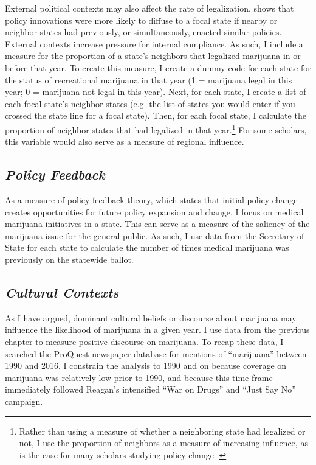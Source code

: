 External political contexts may also affect the rate of legalization. \citet{boushey_2016}shows that policy innovations were more likely to diffuse to a focal state if nearby or neighbor states had previously, or simultaneously, enacted similar policies. External contexts increase pressure for internal compliance. As such, I include a measure for the proportion of a state's neighbors that legalized marijuana in or before that year. To create this measure, I create a dummy code for each state for the status of recreational marijuana in that year (1 = marijuana legal in this year; 0 = marijuana not legal in this year). Next, for each state, I create a list of each focal state's neighbor states (e.g. the list of states you would enter if you crossed the state line for a focal state). Then, for each focal state, I calculate the proportion of neighbor states that had legalized in that year.\footnote{Rather than using a measure of whether a neighboring state had legalized or not, I use the proportion of neighbors as a measure of increasing influence, as is the case for many scholars studying policy change \citep{boushey_2016,key_1949}.} For some scholars, this variable would also serve as a measure of regional influence.


\subsection{\it{Policy Feedback}}

As a measure of policy feedback theory, which states that initial policy change creates opportunities for future policy expansion and change, I focus on medical marijuana initiatives in a state. This can serve as a measure of the saliency of the marijuana issue for the general public. As such, I use data from the Secretary of State for each state to calculate the number of times medical marijuana was previously on the statewide ballot.


\subsection{\it{Cultural Contexts}}

As I have argued, dominant cultural beliefs or discourse about marijuana may influence the likelihood of marijuana in a given year. I use data from the previous chapter to measure positive discourse on marijuana. To recap these data, I searched the ProQuest newspaper database for mentions of ``marijuana'' between 1990 and 2016. I constrain the analysis to 1990 and on because coverage on marijuana was relatively low prior to 1990, and because this time frame immediately followed Reagan's intensified ``War on Drugs'' and ``Just Say No'' campaign. 


